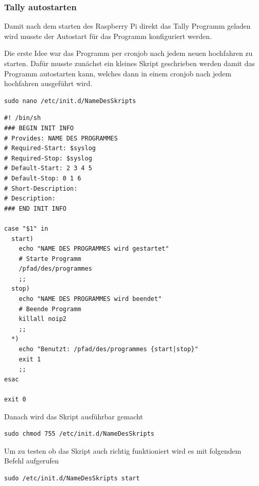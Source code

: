 \documentclass[11pt,a4paper]{article} %
\begin{document}
\subsubsection{Tally autostarten}
Damit nach dem starten des Raspberry Pi direkt das Tally Programm geladen wird musste der Autostart f\"ur das Programm konfiguriert werden.
\par
Die erste Idee war das Programm per cronjob nach jedem neuen hochfahren zu starten. Daf\"ur musste zun\"achst ein kleines Skript geschrieben werden damit das Programm autostarten kann, welches dann in einem cronjob nach jedem hochfahren ausgef\"uhrt wird.
\begin{frame}

\begin{lstlisting}
sudo nano /etc/init.d/NameDesSkripts
\end{lstlisting}
\end{frame}
\begin{frame}

\begin{lstlisting}
#! /bin/sh
### BEGIN INIT INFO
# Provides: NAME DES PROGRAMMES
# Required-Start: $syslog
# Required-Stop: $syslog
# Default-Start: 2 3 4 5
# Default-Stop: 0 1 6
# Short-Description:
# Description:
### END INIT INFO
 
case "$1" in
  start)
    echo "NAME DES PROGRAMMES wird gestartet"
    # Starte Programm
    /pfad/des/programmes
    ;;
  stop)
    echo "NAME DES PROGRAMMES wird beendet"
    # Beende Programm
    killall noip2
    ;;
  *)
    echo "Benutzt: /pfad/des/programmes {start|stop}"
    exit 1
    ;;
esac
 
exit 0
\end{lstlisting}
\end{frame}

Danach wird das Skript ausf\"uhrbar gemacht
\begin{frame}

\begin{lstlisting}
sudo chmod 755 /etc/init.d/NameDesSkripts
\end{lstlisting}
\end{frame}
Um zu testen ob das Skript auch richtig funktioniert wird es mit folgendem Befehl aufgerufen
\begin{frame}

\begin{lstlisting}
sudo /etc/init.d/NameDesSkripts start
\end{lstlisting}
\end{frame}
\end{document}
